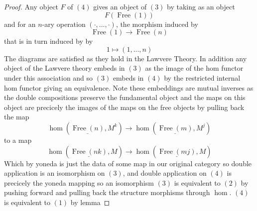 \documentclass{article}
\begin{document}
\begin{proof}
    Any object $F$ of $(4)$ gives an object of $(3)$ by taking as an object 
    \[
    F(\operatorname{Free}(1))
    \]
    and for an $n$-ary operation $(\cdot,...,\cdot)$, the morphism induced by 
    \[
    \operatorname{Free}(1) \to \operatorname{Free}(n)
    \] 
    that is in turn induced by by 
    \[
    1 \mapsto (1,...,n)
    \]
    The diagrams are satisfied as they hold in the Lawvere Theory. In addition any object of the Lawvere theory embeds in $(3)$ as the image of the hom functor under this association and so $(3)$ embeds in $(4)$ by the restricted internal hom functor giving an equivalence. Note these embeddings are mutual inverses as the double compositions preserve the fundamental object and the maps on this object are precicely the images of the maps on the free objects by pulling back the map 
    \[
    \hom(\underline{\operatorname{Free}(n)},M^k) \to \hom(\underline{\operatorname{Free}(m)},M^j)
    \]
    to a map 
    \[
    \hom(\underline{\operatorname{Free}(nk)},M) \to \hom(\underline{\operatorname{Free}(mj)},M)
    \]
    Which by yoneda is just the data of some map in our original category so double application is an isomorphism on $(3)$, and double application on $(4)$ is precicely the yoneda mapping so an isomorphism
    \newline
    $(3)$ is equivalent to $(2)$ by pushing forward and pulling back the structure morphisms through $\hom$.
    \newline
    $(4)$ is equivalent to $(1)$ by lemma
\end{proof}
\end{document}
